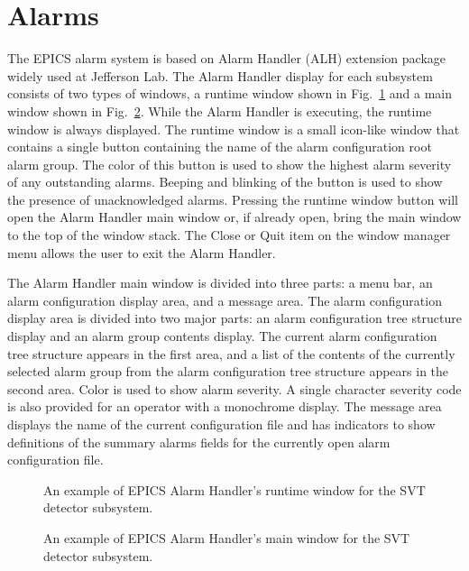 \documentclass[letter,10pt]{article}
\begin{document}
\section{Alarms}
The EPICS alarm system is based on Alarm Handler (ALH) extension package widely used at Jefferson Lab.
The Alarm Handler display for each subsystem consists of two types of windows, a runtime window shown in 
Fig.~\ref{fig:alarm_runtime} and a main window shown in Fig.~\ref{fig:alarm_main_window}. 
While the Alarm Handler is executing, the runtime window is always displayed. 
The runtime window is a small icon-like window that contains a single button containing the name of the alarm configuration 
root alarm group. The color of this button is used to show the highest alarm severity of any outstanding alarms. Beeping and 
blinking of the button is used to show the presence of unacknowledged alarms. Pressing the runtime window button will open 
the Alarm Handler main window or, if already open, bring the main window to the top of the window stack. The Close or Quit 
item on the window manager menu allows the user to exit the Alarm Handler.

The Alarm Handler main window is divided into three parts: a menu bar, an alarm configuration display area, and a message area.
The alarm configuration display area is divided into two major parts: an alarm configuration tree structure display and an 
alarm group contents display. The current alarm configuration tree structure appears in the first area, and a list of the 
contents of the currently selected alarm group from the alarm configuration tree structure appears in the second area. 
Color is used to show alarm severity. A single character severity code is also provided for an operator with a monochrome display.
The message area displays the name of the current configuration file and has indicators to show definitions of the summary 
alarms fields for the currently open alarm configuration file.

 \begin{figure}
  \centering
  \caption{An example of EPICS Alarm Handler's runtime window for the SVT detector subsystem.}
  \label{fig:alarm_runtime}
 \end{figure}

 \begin{figure}
  \centering
  \caption{An example of EPICS Alarm Handler's main window for the SVT detector subsystem.}
  \label{fig:alarm_main_window}
 \end{figure}
\end{document}
